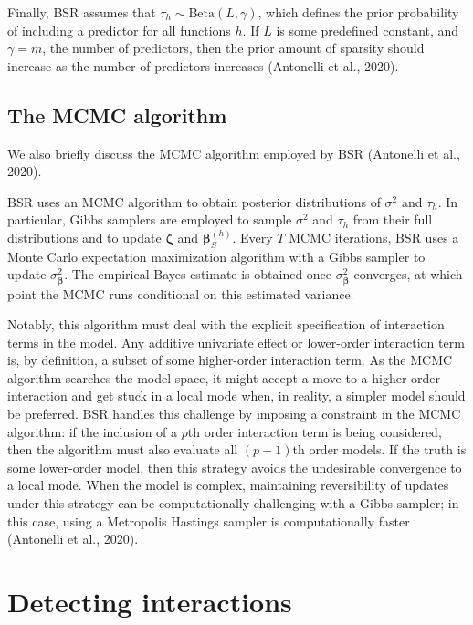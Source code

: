 \documentclass[12pt, twoside]{amherstthesis}
\begin{document}
Finally, BSR assumes that \(\tau_h \sim \textrm{Beta}(L,\gamma)\), which defines the prior probability of including a predictor for all functions \(h\). If \(L\) is some predefined constant, and \(\gamma=m\), the number of predictors, then the prior amount of sparsity should increase as the number of predictors increases (Antonelli et al., 2020).

\hypertarget{the-mcmc-algorithm-1}{%
\subsection{The MCMC algorithm}\label{the-mcmc-algorithm-1}}

We also briefly discuss the MCMC algorithm employed by BSR (Antonelli et al., 2020).

BSR uses an MCMC algorithm to obtain posterior distributions of \(\sigma^2\) and \(\tau_h\). In particular, Gibbs samplers are employed to sample \(\sigma^2\) and \(\tau_h\) from their full distributions and to update \(\boldsymbol\zeta\) and \(\boldsymbol\beta_S^{(h)}\). Every \(T\) MCMC iterations, BSR uses a Monte Carlo expectation maximization algorithm with a Gibbs sampler to update \(\sigma^2_{\boldsymbol\beta}\). The empirical Bayes estimate is obtained once \(\sigma^2_{\boldsymbol\beta}\) converges, at which point the MCMC runs conditional on this estimated variance.

Notably, this algorithm must deal with the explicit specification of interaction terms in the model. Any additive univariate effect or lower-order interaction term is, by definition, a subset of some higher-order interaction term. As the MCMC algorithm searches the model space, it might accept a move to a higher-order interaction and get stuck in a local mode when, in reality, a simpler model should be preferred. BSR handles this challenge by imposing a constraint in the MCMC algorithm: if the inclusion of a \(p\)th order interaction term is being considered, then the algorithm must also evaluate all \((p-1)\)th order models. If the truth is some lower-order model, then this strategy avoids the undesirable convergence to a local mode. When the model is complex, maintaining reversibility of updates under this strategy can be computationally challenging with a Gibbs sampler; in this case, using a Metropolis Hastings sampler is computationally faster (Antonelli et al., 2020).

\hypertarget{detecting-interactions}{%
\section{Detecting interactions}\label{detecting-interactions}}
\end{document}
